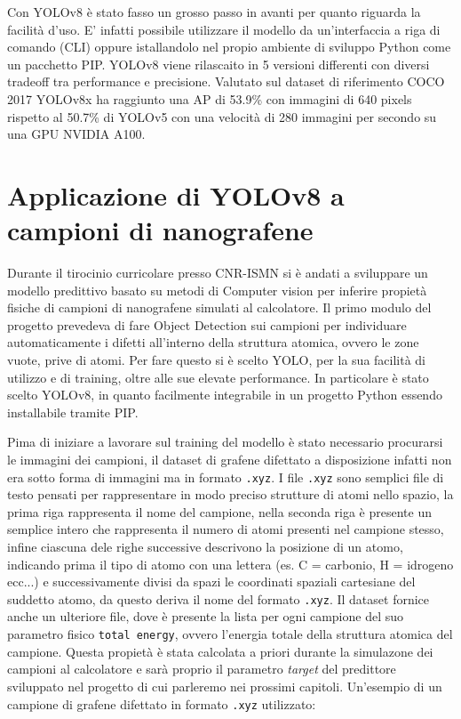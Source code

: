 \documentclass[12pt,a4paper,openright,twoside]{report}
\begin{document}
\newpage
Con YOLOv8 è stato fasso un grosso passo in avanti per quanto riguarda la facilità d'uso.
E' infatti possibile utilizzare il modello da un'interfaccia a riga di comando (CLI) oppure istallandolo nel propio ambiente di sviluppo Python come un pacchetto PIP. 
YOLOv8 viene rilascaito in 5 versioni differenti con diversi tradeoff tra performance e precisione.
Valutato sul dataset di riferimento COCO 2017 YOLOv8x ha raggiunto una AP di 53.9\% con immagini di 640 pixels rispetto al 50.7\% di YOLOv5 con una velocità di 280 immagini per secondo su una GPU NVIDIA A100. 

\newpage
\section{Applicazione di YOLOv8 a campioni di nanografene}
Durante il tirocinio curricolare presso CNR-ISMN si è andati a sviluppare un modello predittivo basato su metodi di Computer vision per inferire propietà fisiche di campioni di nanografene simulati al calcolatore. 
Il primo modulo del progetto prevedeva di fare Object Detection sui campioni per individuare automaticamente i difetti all'interno della struttura atomica, ovvero le zone vuote, prive di atomi. 
Per fare questo si è scelto YOLO, per la sua facilità di utilizzo e di training, oltre alle sue elevate performance. In particolare è stato scelto YOLOv8, in quanto facilmente integrabile in un progetto Python essendo installabile tramite PIP. 

Pima di iniziare a lavorare sul training del modello è stato necessario procurarsi le immagini dei campioni, il dataset di grafene difettato a disposizione infatti non era sotto forma di immagini ma in formato \texttt{.xyz}. I file \texttt{.xyz} sono semplici file di testo pensati per rappresentare in modo preciso strutture di atomi nello spazio, la prima riga rappresenta il nome del campione, nella seconda riga è presente un semplice intero che rappresenta il numero di atomi presenti nel campione stesso, infine ciascuna dele righe successive descrivono la posizione di un atomo, indicando prima il tipo di atomo con una lettera (es. C = carbonio, H = idrogeno ecc...) e successivamente divisi da spazi le coordinati spaziali cartesiane del suddetto atomo, da questo deriva il nome del formato \texttt{.xyz}. Il dataset fornice anche un ulteriore file, dove è presente la lista per ogni campione del suo parametro fisico \texttt{total energy}, ovvero l'energia totale della struttura atomica del campione. Questa propietà è stata calcolata a priori durante la simulazone dei campioni al calcolatore e sarà proprio il parametro \emph{target} del predittore sviluppato nel progetto di cui parleremo nei prossimi capitoli. \newpage
Un'esempio di un campione di grafene difettato in formato \texttt{.xyz} utilizzato:
\end{document}
